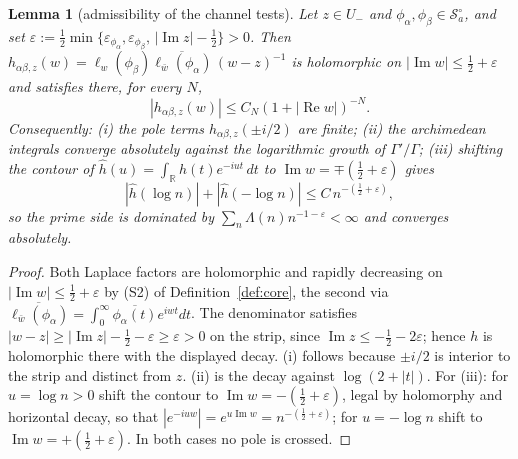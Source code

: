\documentclass[11pt]{amsart}
\newtheorem{lemma}[theorem]{Lemma}
\theoremstyle{definition}
\theoremstyle{remark}
\theoremstyle{definition}
\renewcommand{\Re}{\operatorname{Re}}
\renewcommand{\Im}{\operatorname{Im}}
\newcommand{\half}{\tfrac{1}{2}}
\newcommand{\eps}{\varepsilon}
\newcommand{\cS}{\mathcal{S}}
\newcommand{\R}{\mathbb{R}}
\begin{document}
\begin{lemma}[admissibility of the channel tests]\label{lem:weil-admissible}
Let $z\in U_-$ and $\phi_\alpha,\phi_\beta\in\cS_a^\circ$, and set
$\eps:=\tfrac12\min\{\eps_{\phi_\alpha},\eps_{\phi_\beta},\,|\Im z|-\half\}>0$.  Then
$h_{\alpha\beta,z}(w)=\ell_w(\phi_\beta)\overline{\ell_{\bar w}(\phi_\alpha)}\,(w-z)^{-1}$ is
holomorphic on $|\Im w|\le\half+\eps$ and satisfies there, for every $N$,
\[
   |h_{\alpha\beta,z}(w)|\le C_N(1+|\Re w|)^{-N}.
\]
Consequently: \textnormal{(i)} the pole terms $h_{\alpha\beta,z}(\pm i/2)$ are finite;
\textnormal{(ii)} the archimedean integrals converge absolutely against the logarithmic growth of
$\Gamma'/\Gamma$; \textnormal{(iii)} shifting the contour of
$\widehat h(u)=\int_\R h(t)e^{-iut}\,dt$ to $\Im w=\mp(\half+\eps)$ gives
\[
   |\widehat h(\log n)|+|\widehat h(-\log n)|\le C\,n^{-(\half+\eps)},
\]
so the prime side is dominated by $\sum_n\Lambda(n)n^{-1-\eps}<\infty$ and converges absolutely.
\end{lemma}

\begin{proof}
Both Laplace factors are holomorphic and rapidly decreasing on $|\Im w|\le\half+\eps$ by
\textnormal{(S2)} of Definition~\ref{def:core}, the second via
$\overline{\ell_{\bar w}(\phi_\alpha)}=\int_0^\infty\overline{\phi_\alpha(t)}e^{iwt}dt$.  The
denominator satisfies $|w-z|\ge|\Im z|-\half-\eps\ge\eps>0$ on the strip, since
$\Im z\le-\half-2\eps$; hence $h$ is holomorphic there with the displayed decay.  \textnormal{(i)}
follows because $\pm i/2$ is interior to the strip and distinct from $z$.  \textnormal{(ii)} is the
decay against $\log(2+|t|)$.  For \textnormal{(iii)}: for $u=\log n>0$ shift the contour to
$\Im w=-(\half+\eps)$, legal by holomorphy and horizontal decay, so that
$|e^{-iuw}|=e^{u\Im w}=n^{-(\half+\eps)}$; for $u=-\log n$ shift to
$\Im w=+(\half+\eps)$.  In both cases no pole is crossed.
\end{proof}
\end{document}
